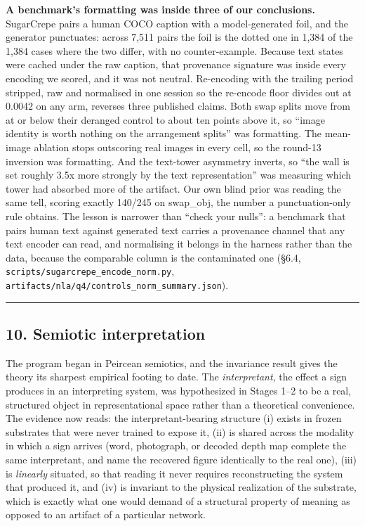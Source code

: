 \documentclass[
  11pt,
]{article}
\begin{document}
\begin{enumerate}
  \textbf{A benchmark's formatting was inside three of our conclusions.}
  SugarCrepe pairs a human COCO caption with a model-generated foil, and
  the generator punctuates: across 7,511 pairs the foil is the dotted
  one in 1,384 of the 1,384 cases where the two differ, with no
  counter-example. Because text states were cached under the raw
  caption, that provenance signature was inside every encoding we
  scored, and it was not neutral. Re-encoding with the trailing period
  stripped, raw and normalised in one session so the re-encode floor
  divides out at 0.0042 on any arm, reverses three published claims.
  Both swap splits move from at or below their deranged control to about
  ten points above it, so ``image identity is worth nothing on the
  arrangement splits'' was formatting. The mean-image ablation stops
  outscoring real images in every cell, so the round-13 inversion was
  formatting. And the text-tower asymmetry inverts, so ``the wall is set
  roughly 3.5x more strongly by the text representation'' was measuring
  which tower had absorbed more of the artifact. Our own blind prior was
  reading the same tell, scoring exactly 140/245 on swap\_obj, the
  number a punctuation-only rule obtains. The lesson is narrower than
  ``check your nulls'': a benchmark that pairs human text against
  generated text carries a provenance channel that any text encoder can
  read, and normalising it belongs in the harness rather than the data,
  because the comparable column is the contaminated one (§6.4,
  \texttt{scripts/sugarcrepe\_encode\_norm.py},
  \texttt{artifacts/nla/q4/controls\_norm\_summary.json}).
\end{enumerate}

\begin{center}\rule{0.5\linewidth}{0.5pt}\end{center}

\subsection{10. Semiotic interpretation}\label{semiotic-interpretation}

The program began in Peircean semiotics, and the invariance result gives
the theory its sharpest empirical footing to date. The
\emph{interpretant}, the effect a sign produces in an interpreting
system, was hypothesized in Stages 1--2 to be a real, structured object
in representational space rather than a theoretical convenience. The
evidence now reads: the interpretant-bearing structure (i) exists in
frozen substrates that were never trained to expose it, (ii) is shared
across the modality in which a sign arrives (word, photograph, or
decoded depth map complete the same interpretant, and name the recovered
figure identically to the real one), (iii) is \emph{linearly} situated,
so that reading it never requires reconstructing the system that
produced it, and (iv) is invariant to the physical realization of the
substrate, which is exactly what one would demand of a structural
property of meaning as opposed to an artifact of a particular network.
\end{document}
